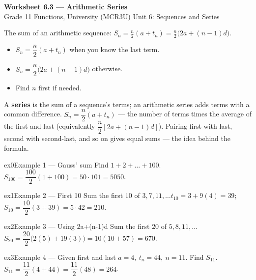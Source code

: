 \documentclass[11pt]{article}
\begin{document}
\begin{center}
{\LARGE\bfseries\color{titleblue}Worksheet 6.3 --- Arithmetic Series}\\[2pt]
{\small Grade 11 Functions, University (MCR3U) \textperiodcentered{} Unit 6: Sequences and Series}
\end{center}

\begin{ideabox}
The sum of an arithmetic sequence: $S_n=\tfrac{n}{2}(a+t_n)=\tfrac{n}{2}\big(2a+(n-1)d\big)$.
\begin{itemize}[leftmargin=*,itemsep=2pt]
  \item $S_n=\dfrac{n}{2}(a+t_n)$ when you know the last term.
  \item $S_n=\dfrac{n}{2}\big(2a+(n-1)d\big)$ otherwise.
  \item Find $n$ first if needed.
\end{itemize}
\end{ideabox}

\begin{learnbox}
A \textbf{series} is the sum of a sequence's terms; an arithmetic series adds terms with a common difference.
$S_n=\dfrac{n}{2}(a+t_n)$ — the number of terms times the average of the first and last (equivalently $\dfrac{n}{2}\left[2a+(n-1)d\right]$).
Pairing first with last, second with second-last, and so on gives equal sums — the idea behind the formula.
\end{learnbox}


\begin{example}{ex0}{Example 1 --- Gauss' sum}
Find $1+2+\dots+100$.\soln $S_{100}=\dfrac{100}{2}(1+100)=50\cdot101=5050$.
\end{example}

\begin{example}{ex1}{Example 2 --- First 10}
Sum the first $10$ of $3,7,11,\dots$\soln $t_{10}=3+9(4)=39$; $S_{10}=\dfrac{10}{2}(3+39)=5\cdot42=210$.
\end{example}

\begin{example}{ex2}{Example 3 --- Using 2a+(n-1)d}
Sum the first $20$ of $5,8,11,\dots$\soln $S_{20}=\dfrac{20}{2}\big(2(5)+19(3)\big)=10(10+57)=670$.
\end{example}

\begin{example}{ex3}{Example 4 --- Given first and last}
$a=4,\ t_n=44,\ n=11$. Find $S_{11}$.\soln $S_{11}=\dfrac{11}{2}(4+44)=\dfrac{11}{2}(48)=264$.
\end{example}
\end{document}
